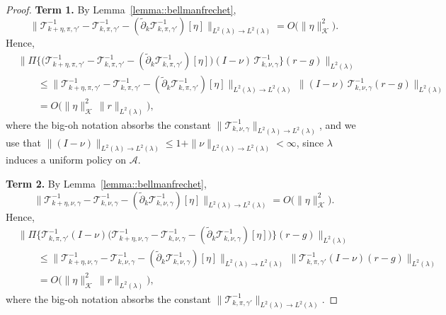 \documentclass[11pt]{article}
\newcommand{\adk}{\widetilde{\partial}_k}
\theoremstyle{plain}
\begin{document}
\begin{proof}
\noindent \textbf{Term 1.}  
By Lemma~\ref{lemma::bellmanfrechet},
\[
\|\mathcal T_{k+\eta,\pi, \gamma'}^{-1}-\mathcal T_{k,\pi, \gamma'}^{-1}-(\adk\mathcal T_{k,\pi,\gamma'}^{-1})[\eta]\|_{L^2(\lambda)\to L^2(\lambda)}
= O\!\big(\|\eta\|_{\mathcal K}^2\big).
\]
Hence,
\begin{align*}
    &\Big\|\Pi\Big\{\big(\mathcal{T}_{k+\eta,\pi,\gamma'}^{-1}-\mathcal{T}_{k,\pi,\gamma'}^{-1}
      - (\adk \mathcal{T}_{k,\pi,\gamma'}^{-1})[\eta]\big)(I-\nu)\,\mathcal{T}_{k,\nu,\gamma}^{-1}\Big\}(r-g) \Big\|_{L^2(\lambda)} \\
    &\qquad \le \|\mathcal{T}_{k+\eta,\pi,\gamma'}^{-1}-\mathcal{T}_{k,\pi,\gamma'}^{-1}
      - (\adk \mathcal{T}_{k,\pi,\gamma'}^{-1})[\eta]\|_{L^2(\lambda)\to L^2(\lambda)} \,
      \|(I-\nu)\,\mathcal{T}_{k,\nu,\gamma}^{-1}(r-g)\|_{L^2(\lambda)} \\
    &\qquad = O\!\big(\|\eta\|_{\mathcal K}^2 \, \|r\|_{L^2(\lambda)}\big),
\end{align*}
where the big-oh notation absorbs the constant 
\(\|\mathcal{T}_{k,\nu,\gamma}^{-1}\|_{L^2(\lambda)\to L^2(\lambda)}\), and we use that 
\(\|(I-\nu)\|_{L^2(\lambda)\to L^2(\lambda)} \leq 1 + \|\nu\|_{L^2(\lambda)\to L^2(\lambda)} < \infty\), 
since \(\lambda\) induces a uniform policy on \(\mathcal{A}\).



\noindent \textbf{Term 2.}  
By Lemma~\ref{lemma::bellmanfrechet},
\[
\|\mathcal T_{k+\eta,\nu, \gamma}^{-1}-\mathcal T_{k,\nu, \gamma}^{-1}-(\adk\mathcal T_{k,\nu,\gamma}^{-1})[\eta]\|_{L^2(\lambda)\to L^2(\lambda)}
= O\!\big(\|\eta\|_{\mathcal K}^2\big).
\]
Hence,
\begin{align*}
    &\Big\|\Pi\Big\{\mathcal{T}_{k,\pi,\gamma'}^{-1}(I-\nu)\big(\mathcal{T}_{k+\eta,\nu,\gamma}^{-1}-\mathcal{T}_{k,\nu,\gamma}^{-1}
      - (\adk \mathcal{T}_{k,\nu,\gamma}^{-1})[\eta]\big)\Big\}(r-g) \Big\|_{L^2(\lambda)} \\
    &\qquad \le \|\mathcal{T}_{k+\eta,\nu,\gamma}^{-1}-\mathcal{T}_{k,\nu,\gamma}^{-1}
      - (\adk \mathcal{T}_{k,\nu,\gamma}^{-1})[\eta]\|_{L^2(\lambda)\to L^2(\lambda)} \,
      \|\mathcal{T}_{k,\pi,\gamma'}^{-1}(I-\nu)(r-g)\|_{L^2(\lambda)} \\
    &\qquad = O\!\big(\|\eta\|_{\mathcal K}^2 \, \|r\|_{L^2(\lambda)}\big),
\end{align*}
where the big-oh notation absorbs the constant 
\(\|\mathcal{T}_{k,\pi,\gamma'}^{-1}\|_{L^2(\lambda)\to L^2(\lambda)} \).




\end{proof}
\end{document}
